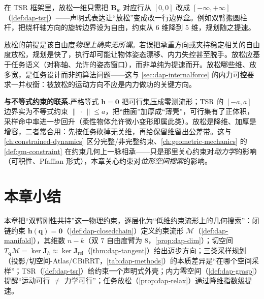 在 TSR 框架里，放松一维只需把 $\mathbf{B}_w$ 对应行从 $[0,0]$ 改成 $[-\infty,+\infty]$（\cref{def:dap-tsr}）——声明式表达让“放松”变成改一行边界盒。例如双臂搬圆柱杆，把绕杆轴方向的旋转边界设为自由，约束从 $6$ 维降到 $5$ 维，规划随之提速。

\begin{pitfall}[别把“放松”放成“放飞”]
放松的前提是该自由度\emph{物理上确实无所谓}。若误把承重方向或夹持稳定相关的自由度放松，规划是快了，执行却可能让物体姿态漂移、内力失控甚至脱手。放松应基于任务语义（对称轴、允许的姿态窗口），而非单纯为提速而开。放松哪些维、放多宽，是任务设计而非纯算法问题——这与 \cref{sec:dap-internalforce} 的内力可控要求一并权衡：被放松的运动方向不应是内力做功的关键方向。
\end{pitfall}

\begin{note}
\textbf{与不等式约束的联系.}\;严格等式 $\mathbf{h}=\mathbf{0}$ 把可行集压成零测流形；TSR 的 $[-a,a]$ 边界实为不等式约束 $\|\,\cdot\,\|\le a$，把“曲面”加厚成“薄壳”，可行集有了正体积，采样命中率进一步回升（柔性物体允许微小变形即属此类）。放松是降维、加厚是增容，二者常合用：先按任务砍掉无关维，再给保留维留出公差带。这与 \cref{ch:constrained-dynamics} 区分完整/非完整约束、\cref{ch:geometric-mechanics} 的 \cref{def:gm-constraint} 在约束几何上一脉相承——只是那里关心约束对\emph{动力学}的影响（可积性、Pfaffian 形式），本章关心约束对\emph{位形空间搜索}的影响。
\end{note}

\section*{本章小结}

本章把“双臂刚性共持”这一物理约束，逐层化为“低维约束流形上的几何搜索”：闭链约束 $\mathbf{h}(\mathbf{q})=\mathbf{0}$（\cref{def:dap-closedchain}）定义约束流形 $\mathcal{M}$（\cref{def:dap-manifold}），其维数 $n-k$（双 $7$ 自由度臂为 $8$，\cref{prop:dap-dim}）；切空间 $T_{\mathbf{q}}\mathcal{M}=\ker\mathbf{J}_h\approx\ker\mathbf{J}_{\text{rel}}$（\cref{thm:dap-tangent}）给出迈步方向；三类采样规划（投影/切空间-Atlas/CBiRRT，\cref{tab:dap-methods}）的本质差异是“在哪个空间采样”；TSR（\cref{def:dap-tsr}）给约束一个声明式外壳；内力零空间（\cref{def:dap-grasp}）提醒“运动可行 $\neq$ 力学可行”；任务放松（\cref{prop:dap-relax}）通过降维指数级提速。

